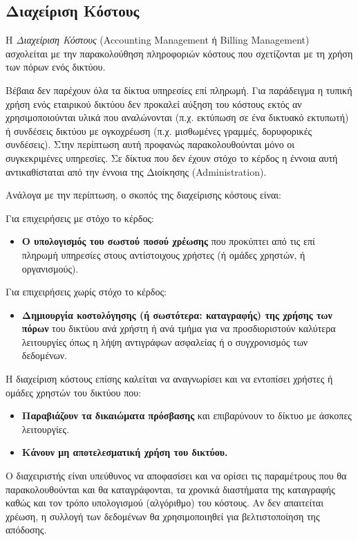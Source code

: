 %
%
\subsection{Διαχείριση Κόστους}

\begin{inthebox}
Η \emph{Διαχείριση Κόστους} (Accounting Management ή Billing Management) ασχολείται με την παρακολούθηση πληροφοριών κόστους που σχετίζονται με τη χρήση των πόρων ενός δικτύου.\\
\end{inthebox}

Βέβαια δεν παρέχουν όλα τα δίκτυα υπηρεσίες επί πληρωμή. Για παράδειγμα η τυπική χρήση ενός εταιρικού δικτύου δεν προκαλεί αύξηση του κόστους εκτός αν χρησιμοποιούνται υλικά που αναλώνονται (π.χ. εκτύπωση σε ένα δικτυακό εκτυπωτή) ή συνδέσεις δικτύου με ογκοχρέωση (π.χ. μισθωμένες γραμμές, δορυφορικές συνδέσεις). Στην περίπτωση αυτή προφανώς παρακολουθούνται μόνο οι συγκεκριμένες υπηρεσίες. Σε δίκτυα που δεν έχουν στόχο το κέρδος η έννοια αυτή αντικαθίσταται από την έννοια της Διοίκησης (Administration). 

Ανάλογα με την περίπτωση, ο σκοπός της διαχείρισης κόστους είναι:

Για επιχειρήσεις με στόχο το κέρδος:

\begin{itemize}
\item \textbf{Ο υπολογισμός του σωστού ποσού χρέωσης} που προκύπτει από τις επί πληρωμή υπηρεσίες στους αντίστοιχους χρήστες (ή ομάδες χρηστών, ή οργανισμούς).
\end{itemize}

Για επιχειρήσεις χωρίς στόχο το κέρδος:

\begin{itemize}
\item \textbf{Δημιουργία κοστολόγησης (ή σωστότερα: καταγραφής) της χρήσης των πόρων} του δικτύου ανά χρήστη ή ανά τμήμα για να προσδιοριστούν καλύτερα λειτουργίες όπως η λήψη αντιγράφων ασφαλείας ή ο συγχρονισμός των δεδομένων.
\end{itemize}

Η διαχείριση κόστους επίσης καλείται να αναγνωρίσει και να εντοπίσει χρήστες ή ομάδες χρηστών του δικτύου που:

\begin{itemize}
\item \textbf{Παραβιάζουν τα δικαιώματα πρόσβασης} και επιβαρύνουν το δίκτυο με άσκοπες λειτουργίες.
\item \textbf{Κάνουν μη αποτελεσματική χρήση του δικτύου.}
\end{itemize}

Ο διαχειριστής είναι υπεύθυνος να αποφασίσει και να ορίσει τις παραμέτρους που θα παρακολουθούνται και θα καταγράφονται, τα χρονικά διαστήματα της καταγραφής καθώς και τον τρόπο υπολογισμού (αλγόριθμο) του κόστους. Αν δεν απαιτείται χρέωση, η συλλογή των δεδομένων θα χρησιμοποιηθεί για βελτιστοποίηση της απόδοσης.